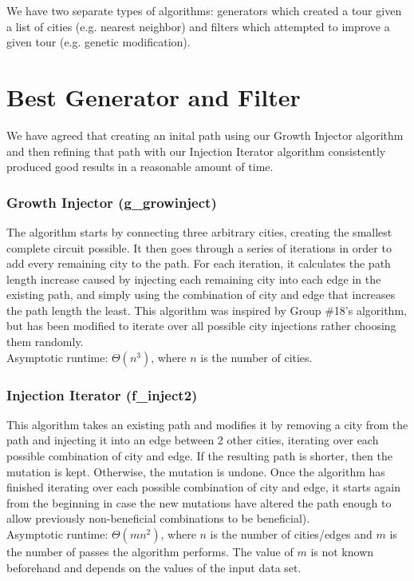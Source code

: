 \documentclass{article}
\begin{document}
We have two separate types of algorithms: generators which created a tour given
a list of cities (e.g. nearest neighbor) and filters which attempted to improve
a given tour (e.g. genetic modification).

\part*{Best Generator and Filter}

We have agreed that creating an inital path using our Growth Injector algorithm
and then refining that path with our Injection Iterator algorithm consistently
produced good results in a reasonable amount of time.

\section*{Growth Injector (g\_growinject)}

The algorithm starts by connecting three arbitrary cities, creating the
smallest complete circuit possible. It then goes through a series of iterations
in order to add every remaining city to the path. For each iteration, it
calculates the path length increase caused by injecting each remaining city
into each edge in the existing path, and simply using the combination of city
and edge that increases the path length the least. This algorithm was inspired
by Group \#18's algorithm, but has been modified to iterate over all possible
city injections rather choosing them randomly.\\Asymptotic runtime: $\Theta
(n^3)$, where $n$ is the number of cities.

\section*{Injection Iterator (f\_inject2)}

This algorithm takes an existing path and modifies it by removing a city from
the path and injecting it into an edge between 2 other cities, iterating over
each possible combination of city and edge. If the resulting path is shorter,
then the mutation is kept. Otherwise, the mutation is undone. Once the
algorithm has finished iterating over each possible combination of city and
edge, it starts again from the beginning in case the new mutations have altered
the path enough to allow previously non-beneficial combinations to be
beneficial).\\Asymptotic runtime: $\Theta (mn^2)$, where $n$ is the number of
cities/edges and $m$ is the number of passes the algorithm performs. The value
of $m$ is not known beforehand and depends on the values of the input data set.
\end{document}

